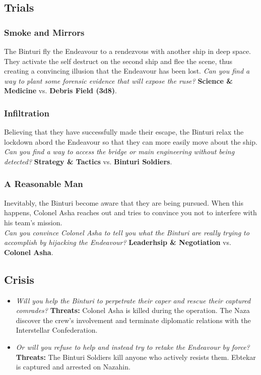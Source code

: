 \documentclass[11pt, a5paper, parskip=half-, DIV=12]{scrartcl}
\begin{document}
\subsection*{Trials}
\subsubsection*{Smoke and Mirrors}
The Binturi fly the Endeavour to a rendezvous with another ship in deep space. They activate the self destruct on the second ship and flee the scene, thus creating a convincing illusion that the Endeavour has been lost. \textit{Can you find a way to plant some forensic evidence that will expose the ruse?} \textbf{Science \& Medicine} vs. \textbf{Debris Field (3d8)}.

\subsubsection*{Infiltration}
Believing that they have successfully made their escape, the Binturi relax the lockdown abord the Endeavour so that they can more easily move about the ship.  \textit{Can you find a way to access the bridge or main engineering without being detected?} \textbf{Strategy \& Tactics} vs. \textbf{Binturi Soldiers}.

\subsubsection*{A Reasonable Man}
Inevitably, the Binturi become aware that they are being pursued. When this happens, Colonel Asha reaches out and tries to convince you not to interfere with his team's mission. \\ \textit{Can you convince Colonel Asha to tell you what the Binturi are really trying to accomplish by hijacking the Endeavour?} \textbf{Leaderhsip \& Negotiation} vs. \textbf{Colonel Asha}.

\subsection*{Crisis}

\begin{itemize}
	\item \textit{Will you help the Binturi to perpetrate their caper and rescue their captured comrades?} \textbf{Threats:} Colonel Asha is killed during the operation. The Naza discover the crew's involvement and terminate diplomatic relations with the Interstellar Confederation.
	\item \textit{Or will you refuse to help and instead try to retake the Endeavour by force?} \textbf{Threats:} The Binturi Soldiers kill anyone who actively resists them. Ebtekar is captured and arrested on Nazahin.
\end{itemize}
\end{document}
